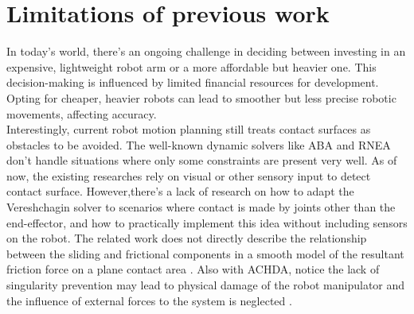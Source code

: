 \documentclass[report.tex]{subfiles}
\begin{document}
    \section{Limitations of previous work}\label{Limitations of previous work}
    In today's world, there's an ongoing challenge in deciding between investing in an expensive, lightweight robot arm or a more affordable but heavier one. This decision-making is influenced by limited financial resources for development. Opting for cheaper, heavier robots can lead to smoother but less precise robotic movements, affecting accuracy.\\Interestingly, current robot motion planning still treats contact surfaces as obstacles to be avoided. The well-known dynamic solvers like ABA and RNEA don't handle situations where only some constraints are present very well. As of now, the existing researches rely on visual or other sensory input to detect contact surface. However,there's a lack of research on how to adapt the Vereshchagin solver to scenarios where contact is made by joints other than the end-effector, and how to practically implement this idea without including sensors on the robot. The related work does not directly describe the relationship between the sliding and frictional components in a smooth model of the resultant friction force on a plane contact area \cite{kudra2016smooth}. Also with ACHDA, \cite{lee2023real} notice the lack of singularity prevention may lead to physical damage of the robot manipulator and the influence of external forces to the system is neglected \cite{lee2023real}.
\end{document}

